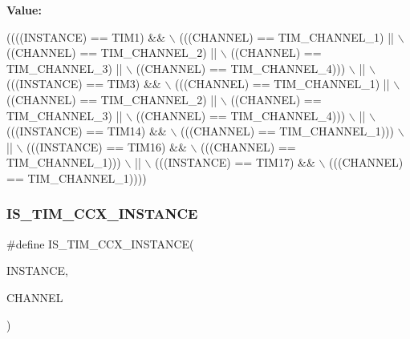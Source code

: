 {\bfseries Value\+:}
\begin{DoxyCode}
((((INSTANCE) == TIM1) &&                   \(\backslash\)
     (((CHANNEL) == TIM\_CHANNEL\_1) ||          \(\backslash\)
      ((CHANNEL) == TIM\_CHANNEL\_2) ||          \(\backslash\)
      ((CHANNEL) == TIM\_CHANNEL\_3) ||          \(\backslash\)
      ((CHANNEL) == TIM\_CHANNEL\_4)))           \(\backslash\)
    ||                                         \(\backslash\)
    (((INSTANCE) == TIM3) &&                   \(\backslash\)
     (((CHANNEL) == TIM\_CHANNEL\_1) ||          \(\backslash\)
      ((CHANNEL) == TIM\_CHANNEL\_2) ||          \(\backslash\)
      ((CHANNEL) == TIM\_CHANNEL\_3) ||          \(\backslash\)
      ((CHANNEL) == TIM\_CHANNEL\_4)))           \(\backslash\)
    ||                                         \(\backslash\)
    (((INSTANCE) == TIM14) &&                  \(\backslash\)
     (((CHANNEL) == TIM\_CHANNEL\_1)))           \(\backslash\)
    ||                                         \(\backslash\)
    (((INSTANCE) == TIM16) &&                  \(\backslash\)
     (((CHANNEL) == TIM\_CHANNEL\_1)))           \(\backslash\)
    ||                                         \(\backslash\)
    (((INSTANCE) == TIM17) &&                  \(\backslash\)
     (((CHANNEL) == TIM\_CHANNEL\_1))))
\end{DoxyCode}
\mbox{\label{group___exported__macro_ga6517a51ea79512a42bc53c718a77f18e}} 
\subsubsection{\texorpdfstring{I\+S\+\_\+\+T\+I\+M\+\_\+\+C\+C\+X\+\_\+\+I\+N\+S\+T\+A\+N\+CE}{IS\_TIM\_CCX\_INSTANCE}\hspace{0.1cm}{\footnotesize\ttfamily [2/16]}}
{\footnotesize\ttfamily \#define I\+S\+\_\+\+T\+I\+M\+\_\+\+C\+C\+X\+\_\+\+I\+N\+S\+T\+A\+N\+CE(\begin{DoxyParamCaption}\item[{}]{I\+N\+S\+T\+A\+N\+CE,  }\item[{}]{C\+H\+A\+N\+N\+EL }\end{DoxyParamCaption})}

